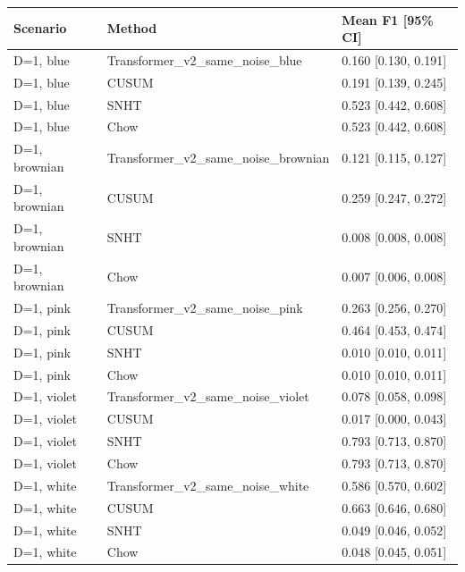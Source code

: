 \begin{tabular}{lll}
\toprule
Scenario & Method & Mean F1 [95\% CI] \\
\midrule
D=1, blue & Transformer\_v2\_same\_noise\_blue & 0.160 [0.130, 0.191] \\
D=1, blue & CUSUM & 0.191 [0.139, 0.245] \\
D=1, blue & SNHT & 0.523 [0.442, 0.608] \\
D=1, blue & Chow & 0.523 [0.442, 0.608] \\
D=1, brownian & Transformer\_v2\_same\_noise\_brownian & 0.121 [0.115, 0.127] \\
D=1, brownian & CUSUM & 0.259 [0.247, 0.272] \\
D=1, brownian & SNHT & 0.008 [0.008, 0.008] \\
D=1, brownian & Chow & 0.007 [0.006, 0.008] \\
D=1, pink & Transformer\_v2\_same\_noise\_pink & 0.263 [0.256, 0.270] \\
D=1, pink & CUSUM & 0.464 [0.453, 0.474] \\
D=1, pink & SNHT & 0.010 [0.010, 0.011] \\
D=1, pink & Chow & 0.010 [0.010, 0.011] \\
D=1, violet & Transformer\_v2\_same\_noise\_violet & 0.078 [0.058, 0.098] \\
D=1, violet & CUSUM & 0.017 [0.000, 0.043] \\
D=1, violet & SNHT & 0.793 [0.713, 0.870] \\
D=1, violet & Chow & 0.793 [0.713, 0.870] \\
D=1, white & Transformer\_v2\_same\_noise\_white & 0.586 [0.570, 0.602] \\
D=1, white & CUSUM & 0.663 [0.646, 0.680] \\
D=1, white & SNHT & 0.049 [0.046, 0.052] \\
D=1, white & Chow & 0.048 [0.045, 0.051] \\
\bottomrule
\end{tabular}
